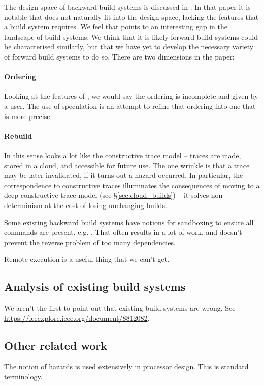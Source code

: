 The design space of backward build systems is discussed in \cite{build_systems_a_la_carte}. In that paper it is notable that \Fabricate does not naturally fit into the design space, lacking the features that a build system requires. We feel that points to an interesting gap in the landscape of build systems. We think that it is likely forward build systems could be characterised similarly, but that we have yet to develop the necessary variety of forward build systems to do so. There are two dimensions in the paper:

\paragraph{Ordering} Looking at the features of \Rattle, we would say the ordering is incomplete and given by a user. The use of speculation is an attempt to refine that ordering into one that is more precise.

\paragraph{Rebuild} In this sense \Rattle looks a lot like the constructive trace model -- traces are made, stored in a cloud, and accessible for future use. The one wrinkle is that a trace may be later invalidated, if it turns out a hazard occurred. In particular, the correspondence to constructive traces illuminates the consequences of moving to a deep constructive trace model (see \S\ref{sec:cloud_builds}) -- it solves non-determinism at the cost of losing unchanging builds.

Some existing backward build systems have notions for sandboxing to ensure all commands are present. e.g. \Bazel. That often results in a lot of work, and doesn't prevent the reverse problem of too many dependencies.

Remote execution is a useful thing that we can't get.

\subsection{Analysis of existing build systems}

We aren't the first to point out that existing build systems are wrong. See \url{https://ieeexplore.ieee.org/document/8812082}.

\subsection{Other related work}

The notion of hazards is used extensively in processor design. This is standard terminology.
